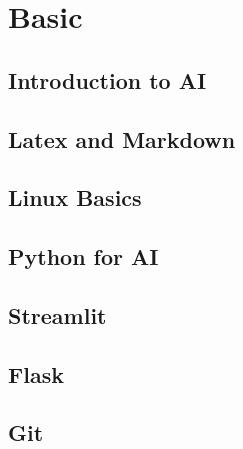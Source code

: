 \documentclass[11pt,fleqn]{book} %
\begin{document}


\pagestyle{empty} %

\tableofcontents %

\cleardoublepage %

\pagestyle{fancy} %

\part{Basic}
\chapter{Introduction to AI}
\chapter{Latex and Markdown}
\chapter{Linux Basics}
\chapter{Python for AI}
\chapter{Streamlit}
\chapter{Flask}
\chapter{Git}
\end{document}
